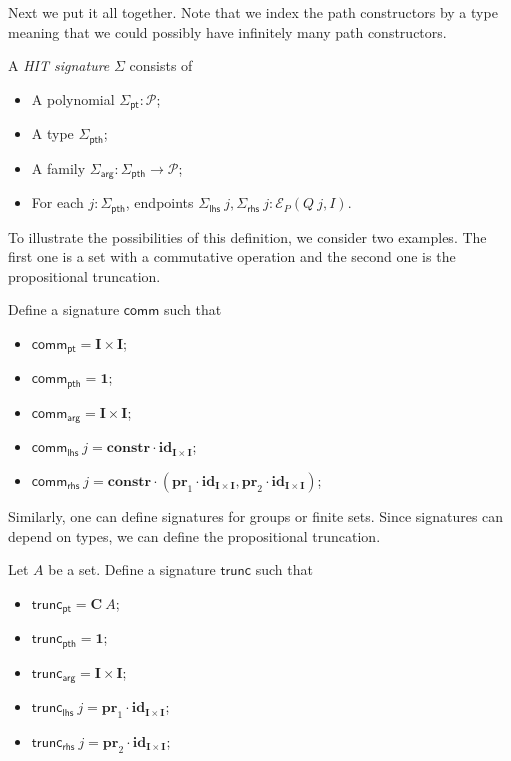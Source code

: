 \documentclass[9pt]{entcs}
\newcommand{\constructor}[1]{\mathbf{#1}}
\newcommand{\function}[1]{\mathsf{#1}}
\newcommand{\0}{\textbf{0}} %
\newcommand{\1}{\textbf{1}} %
\newcommand{\poly}{\mathcal{P}} %
\newcommand{\C}{\constructor{C}} %
\newcommand{\I}{\constructor{I}} %
\newcommand{\prodP}[2]{#1 \times #2} %
\newcommand{\ep}[3]{\mathcal{E}_{#1}(#2,#3)} %
\newcommand{\id}[1]{\constructor{id}_{#1}} %
\newcommand{\comp}[2]{#1 \cdot #2} %
\newcommand{\prle}{\constructor{pr}_1} %
\newcommand{\prre}{\constructor{pr}_2} %
\newcommand{\pair}[2]{(#1 , #2)} %
\newcommand{\constr}{\constructor{constr}} %
\newcommand{\pt}[0]{\textsf{pt}}
\newcommand{\pthI}[0]{\textsf{pth}}
\newcommand{\pthA}[0]{\textsf{arg}}
\newcommand{\pthlh}[0]{\textsf{lhs}}
\newcommand{\pthrh}[0]{\textsf{rhs}}
\newcommand{\pointc}[1]{#1_{\pt}} %
\newcommand{\pathI}[1]{#1_{\pthI}} %
\newcommand{\pathA}[1]{#1_{\pthA}} %
\newcommand{\pathlh}[1]{#1_{\pthlh}} %
\newcommand{\pathrh}[1]{#1_{\pthrh}} %
\newcommand{\comm}{\function{comm}}
\newcommand{\trunc}{\function{trunc}}
\begin{document}
Next we put it all together.
Note that we index the path constructors by a type meaning that we could possibly have infinitely many path constructors.

\begin{definition}
\label{def:signature}
A \emph{HIT signature} $\Sigma$ consists of
\begin{itemize}
	\item A polynomial $\pointc{\Sigma} : \poly$;
	\item A type $\pathI{\Sigma}$;
	\item A family $\pathA{\Sigma} : \pathI{\Sigma} \rightarrow \poly$;
	\item For each $j : \pathI{\Sigma}$, endpoints $\pathlh{\Sigma} \> j, \pathrh{\Sigma} \> j : \ep{P}{Q \> j}{I}$.
\end{itemize}
\end{definition}

To illustrate the possibilities of this definition, we consider two examples.
The first one is a set with a commutative operation and the second one is the propositional truncation.

\begin{example}
\label{ex:commsig}
Define a signature $\comm$ such that
\begin{itemize}
	\item $\pointc{\comm} = \prodP{\I}{\I}$;
	\item $\pathI{\comm} = \1$;
	\item $\pathA{\comm} = \prodP{\I}{\I}$;
	\item $\pathlh{\comm} \> j = \comp{\constr}{\id{\prodP{\I}{\I}}}$;
	\item $\pathrh{\comm} \> j = \comp{\constr}{\pair{\comp{\prle}{\id{\prodP{\I}{\I}}}}{\comp{\prre}{\id{\prodP{\I}{\I}}}}}$;
\end{itemize}
\end{example}

Similarly, one can define signatures for groups or finite sets.
Since signatures can depend on types, we can define the propositional truncation.

\begin{example}
\label{ex:truncsig}
Let $A$ be a set.
Define a signature $\trunc$ such that
\begin{itemize}
	\item $\pointc{\trunc} = \C \> A$;
	\item $\pathI{\trunc} = \1$;
	\item $\pathA{\trunc} = \prodP{\I}{\I}$;
	\item $\pathlh{\trunc} \> j = \comp{\prle}{\id{\prodP{\I}{\I}}}$;
	\item $\pathrh{\trunc} \> j = \comp{\prre}{\id{\prodP{\I}{\I}}}$;
\end{itemize}
\end{example}
\end{document}
